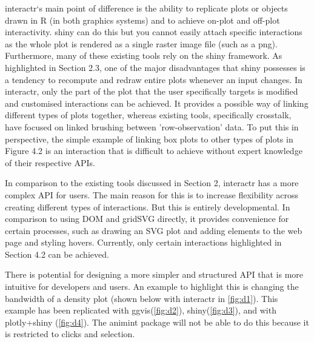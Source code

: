 \documentclass[11pt,]{report}
\begin{document}
\textsf{interactr}`s main point of difference is the ability to
replicate plots or objects drawn in R (in both graphics systems) and to
achieve on-plot and off-plot interactivity. \textsf{shiny} can do this
but you cannot easily attach specific interactions as the whole plot is
rendered as a single raster image file (such as a png). Furthermore,
many of these existing tools rely on the \textsf{shiny} framework. As
highlighted in Section 2.3, one of the major disadvantages that
\textsf{shiny} possesses is a tendency to recompute and redraw entire
plots whenever an input changes. In \textsf{interactr}, only the part of
the plot that the user specifically targets is modified and customised
interactions can be achieved. It provides a possible way of linking
different types of plots together, whereas existing tools, specifically
crosstalk, have focused on linked brushing between 'row-observation'
data. To put this in perspective, the simple example of linking box
plots to other types of plots in Figure 4.2 is an interaction that is
difficult to achieve without expert knowledge of their respective APIs.

In comparison to the existing tools discussed in Section 2,
\textsf{interactr} has a more complex API for users. The main reason for
this is to increase flexibility across creating different types of
interactions. But this is entirely developmental. In comparison to using
\textsf{DOM} and \textsf{gridSVG} directly, it provides convenience for
certain processes, such as drawing an SVG plot and adding elements to
the web page and styling hovers. Currently, only certain interactions
highlighted in Section 4.2 can be achieved.

There is potential for designing a more simpler and structured API that
is more intuitive for developers and users. An example to highlight this
is changing the bandwidth of a density plot (shown below with
\textsf{interactr} in \autoref{fig:d1}). This example has been
replicated with \textsf{ggvis}(\autoref{fig:d2}),
\textsf{shiny}(\autoref{fig:d3}), and with \textsf{plotly+shiny}
(\autoref{fig:d4}). The \textsf{animint} package will not be able to do
this because it is restricted to clicks and selection.
\end{document}
